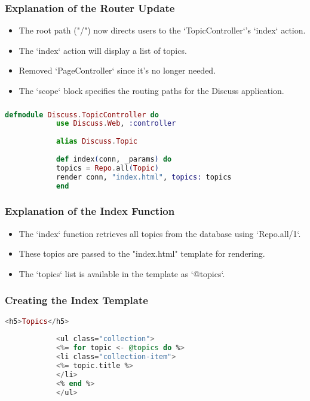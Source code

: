 \documentclass[aspectratio=169, table]{beamer}
\begin{document}
	\begin{frame}
		\frametitle{Explanation of the Router Update}
		\begin{itemize}
			\item The root path ("/") now directs users to the `TopicController`'s `index` action.
			\item The `index` action will display a list of topics.
			\item Removed `PageController` since it’s no longer needed.
			\item The `scope` block specifies the routing paths for the Discuss application.
		\end{itemize}
	\end{frame}
	
	\begin{frame}[fragile]
		\frametitle{}
		\begin{lstlisting}[language=Elixir]
			defmodule Discuss.TopicController do
			use Discuss.Web, :controller
			
			alias Discuss.Topic
			
			def index(conn, _params) do
			topics = Repo.all(Topic)
			render conn, "index.html", topics: topics
			end
		\end{lstlisting}
	\end{frame}
	
	\begin{frame}
		\frametitle{Explanation of the Index Function}
		\begin{itemize}
			\item The `index` function retrieves all topics from the database using `Repo.all/1`.
			\item These topics are passed to the "index.html" template for rendering.
			\item The `topics` list is available in the template as `@topics`.
		\end{itemize}
	\end{frame}
	
	\begin{frame}[fragile]
		\frametitle{Creating the Index Template}
		\begin{lstlisting}[language=elixir]
			<h5>Topics</h5>
			
			<ul class="collection">
			<%= for topic <- @topics do %>
			<li class="collection-item">
			<%= topic.title %>
			</li>
			<% end %>
			</ul>
		\end{lstlisting}
	\end{frame}
	
\end{document}
